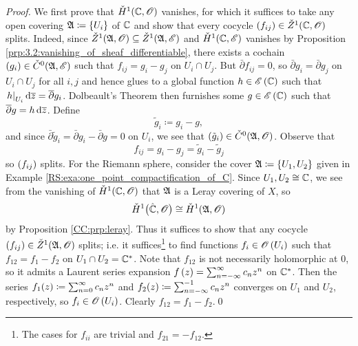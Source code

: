 \documentclass[../Moduli_Spaces_of_Riemann_Surfaces.tex]{subfiles}
\begin{document}
    \begin{proof}
        We first prove that $\check{H}^1\!\left(\mathbb{C},\mathscr{O}\right)$ vanishes, for which it suffices to take any open covering $\mathfrak{A}\coloneqq\left\{U_i\right\}$ of $\mathbb{C}$ and show that every cocycle $\left(f_{ij}\right)\in\check{Z}^1\!\left(\mathbb{C},\mathscr{O}\right)$ splits. Indeed, since $\check{Z}^1\!\left(\mathfrak{A},\mathscr{O}\right)\subseteq\check{Z}^1\!\left(\mathfrak{A},\mathscr{E}\right)$ and $\check{H}^1\!\left(\mathbb{C},\mathscr{E}\right)$ vanishes by Proposition \ref{prp:3.2:vanishing_of_sheaf_differentiable}, there exists a cochain $\left(g_i\right)\in\check{C}^0\!\left(\mathfrak{A},\mathscr{E}\right)$ such that $f_{ij}=g_i-g_j$ on $U_i\cap U_j$. But $\bar{\partial}f_{ij}=0$, so $\bar{\partial}g_i=\bar{\partial}g_j$ on $U_i\cap U_j$ for all $i,j$ and hence glues to a global function $h\in\mathscr{E}\left(\mathbb{C}\right)$ such that $\left.h\right|_{U_i}\mathrm{d}\overline{z}=\overline{\partial}g_i$. Dolbeault's Theorem then furnishes some $g\in\mathscr{E}\left(\mathbb{C}\right)$ such that $\overline{\partial}g=h\,\mathrm{d}\overline{z}$. Define
        \begin{equation*}
            \tilde{g}_i\coloneqq g_i-g,
        \end{equation*}
        and since $\bar{\partial}\tilde{g}_i=\bar{\partial} g_i-\bar{\partial}g=0$ on $U_i$, we see that $\left(\tilde{g}_i\right)\in\check{C}^0\!\left(\mathfrak{A},\mathscr{O}\right)$. Observe that
        \begin{equation*}
            f_{ij}=g_i-g_j=\tilde{g}_i-\tilde{g}_j
        \end{equation*}
        so $\left(f_{ij}\right)$ splits. For the Riemann sphere, consider the cover $\mathfrak{A}\coloneqq\left\{U_1,U_2\right\}$ given in Example \ref{RS:exa:one_point_compactification_of_C}. Since $U_1,U_2\cong\mathbb{C}$, we see from the vanishing of $\check{H}^1\!\left(\mathbb{C},\mathscr{O}\right)$ that $\mathfrak{A}$ is a Leray covering of $X$, so
        \begin{equation*}
            \check{H}^1\big(\hat{\mathbb{C}},\mathscr{O}\big)\cong\check{H}^1\!\left(\mathfrak{A},\mathscr{O}\right)
        \end{equation*}
        by Proposition \ref{CC:prp:leray}. Thus it suffices to show that any cocycle $\left(f_{ij}\right)\in\check{Z}^1\!\left(\mathfrak{A},\mathscr{O}\right)$ splits; i.e. it suffices\footnote{The cases for $f_{ii}$ are trivial and $f_{21}=-f_{12}$.} to find functions $f_i\in\mathscr{O}\left(U_i\right)$ such that $f_{12}=f_1-f_2$ on $U_1\cap U_2=\mathbb{C}^\ast$. Note that $f_{12}$ is not necessarily holomorphic at $0$, so it admits a Laurent series expansion $f\left(z\right)=\sum_{n=-\infty}^{\infty}c_nz^n$ on $\mathbb{C}^\ast$. Then the series $f_1\!\left(z\right)\coloneqq\sum_{n=0}^{\infty}c_nz^n$ and $f_2\!\left(z\right)\coloneqq\sum_{n=-\infty}^{-1}c_nz^n$ converges on $U_1$ and $U_2$, respectively, so $f_i\in\mathscr{O}\left(U_i\right)$. Clearly $f_{12}=f_1-f_2$.\qed
    \end{proof}
\end{document}

